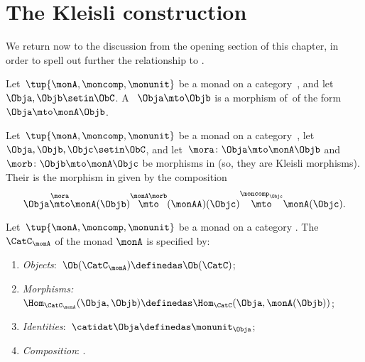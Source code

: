 
\section{The Kleisli construction}
\label{sec:Kleisli}

We return now to the discussion from the opening section of this chapter, in order to spell out further the relationship to .

\begin{ctdefinition}
    \label{def:kleisli-morphism}
    Let~$\tup{\monA, \moncomp, \monunit}$ be a monad on a category~\CatC, and let~$\Obja, \Objb \setin \ObC$.
    A ~$\Obja \mto \Objb$ is a morphism of~\CatC of the form~$\Obja \mto \monA \Objb$.
\end{ctdefinition}

\begin{ctdefinition}
    \label{def:kleisli-composition}
    Let~$\tup{\monA, \moncomp, \monunit}$ be a monad on a category~\CatC, let~$\Obja, \Objb, \Objc \setin \ObC$, and let~$\mora \colon \Obja \mto \monA \Objb$ and $\morb \colon \Objb \mto \monA \Objc$ be morphisms in \CatC (so, they are Kleisli morphisms).
    Their  is the morphism in \CatC given by the composition
    \begin{equation}
        \Obja \overset{\mora}{\mto} \monA(\Objb) \overset{\monA \morb}{\mto} (\monAA)(\Objc) \overset{\moncomp_\Objc}{\mto} \monA(\Objc).
    \end{equation}
\end{ctdefinition}

\begin{ctdefinition}
    \label{def:kleisli-category}
    Let~$\tup{\monA, \moncomp, \monunit}$ be a monad on a category \CatC.
    The  $\CatC_\monA$ of the monad $\monA$ is specified by:
    \begin{enumerate}
        \item \emph{Objects}:~$\Ob(\CatC_\monA) \definedas \Ob(\CatC)$;
        \item \emph{Morphisms:}~$\Hom_{\CatC_\monA}(\Obja, \Objb) \definedas \Hom_{\CatC}(\Obja, \monA(\Objb))$;
        \item \emph{Identities}:~$\catidat\Obja \definedas \monunit_\Obja$;
        \item \emph{Composition}: .
    \end{enumerate}
\end{ctdefinition}

